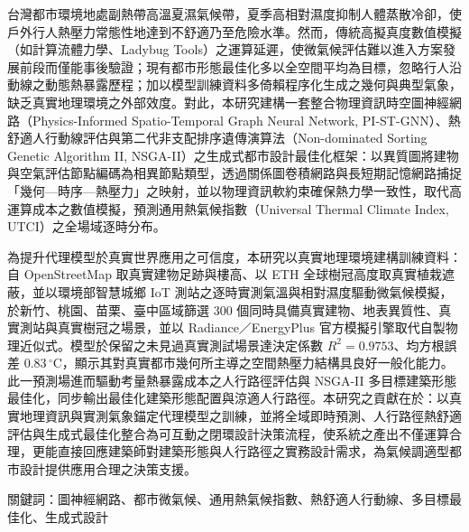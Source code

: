 \begin{abstractzh}

台灣都市環境地處副熱帶高溫夏濕氣候帶，夏季高相對濕度抑制人體蒸散冷卻，使戶外行人熱壓力常態性地達到不舒適乃至危險水準。然而，傳統高擬真度數值模擬（如計算流體力學、Ladybug Tools）之運算延遲，使微氣候評估難以進入方案發展前段而僅能事後驗證；現有都市形態最佳化多以全空間平均為目標，忽略行人沿動線之動態熱暴露歷程；加以模型訓練資料多倚賴程序化生成之幾何與典型氣象，缺乏真實地理環境之外部效度。對此，本研究建構一套整合物理資訊時空圖神經網路（Physics-Informed Spatio-Temporal Graph Neural Network, PI-ST-GNN）、熱舒適人行動線評估與第二代非支配排序遺傳演算法（Non-dominated Sorting Genetic Algorithm II, NSGA-II）之生成式都市設計最佳化框架：以異質圖將建物與空氣評估節點編碼為相異節點類型，透過關係圖卷積網路與長短期記憶網路捕捉「幾何—時序—熱壓力」之映射，並以物理資訊軟約束確保熱力學一致性，取代高運算成本之數值模擬，預測通用熱氣候指數（Universal Thermal Climate Index, UTCI）之全場域逐時分布。

為提升代理模型於真實世界應用之可信度，本研究以真實地理環境建構訓練資料：自 OpenStreetMap 取真實建物足跡與樓高、以 ETH 全球樹冠高度取真實植栽遮蔽，並以環境部智慧城鄉 IoT 測站之逐時實測氣溫與相對濕度驅動微氣候模擬，於新竹、桃園、苗栗、臺中區域篩選 300 個同時具備真實建物、地表異質性、真實測站與真實樹冠之場景，並以 Radiance／EnergyPlus 官方模擬引擎取代自製物理近似式。模型於保留之未見過真實測試場景達決定係數 $R^2 = 0.9753$、均方根誤差 $0.83\,^\circ\text{C}$，顯示其對真實都市幾何所主導之空間熱壓力結構具良好一般化能力。此一預測場進而驅動考量熱暴露成本之人行路徑評估與 NSGA-II 多目標建築形態最佳化，同步輸出最佳化建築形態配置與涼適人行路徑。本研究之貢獻在於：以真實地理資訊與實測氣象錨定代理模型之訓練，並將全域即時預測、人行路徑熱舒適評估與生成式最佳化整合為可互動之閉環設計決策流程，使系統之產出不僅運算合理，更能直接回應建築師對建築形態與人行路徑之實務設計需求，為氣候調適型都市設計提供應用合理之決策支援。

關鍵詞：圖神經網路、都市微氣候、通用熱氣候指數、熱舒適人行動線、多目標最佳化、生成式設計

\end{abstractzh}
